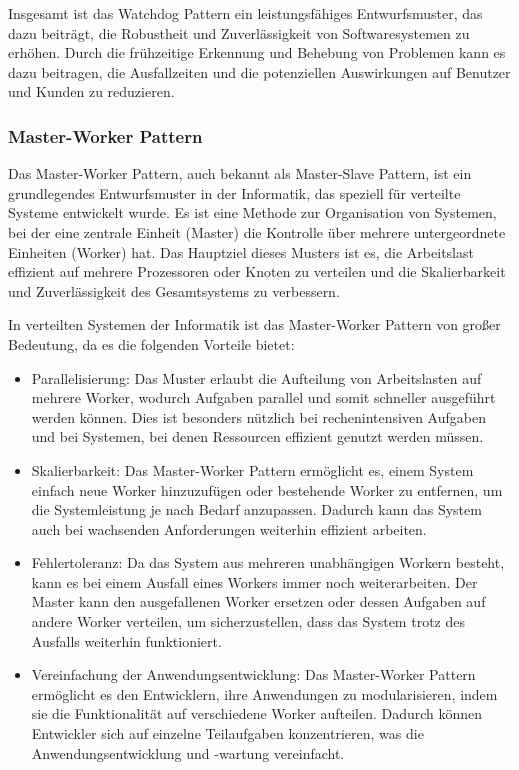 Insgesamt ist das Watchdog Pattern ein leistungsfähiges Entwurfsmuster, das dazu beiträgt, die Robustheit und Zuverlässigkeit von Softwaresystemen zu erhöhen. Durch die frühzeitige Erkennung und Behebung von Problemen kann es dazu beitragen, die Ausfallzeiten und die potenziellen Auswirkungen auf Benutzer und Kunden zu reduzieren.

\subsubsection{Master-Worker Pattern}
Das Master-Worker Pattern, auch bekannt als Master-Slave Pattern, ist ein grundlegendes Entwurfsmuster in der Informatik, das speziell für verteilte Systeme entwickelt wurde. Es ist eine Methode zur Organisation von Systemen, bei der eine zentrale Einheit (Master) die Kontrolle über mehrere untergeordnete Einheiten (Worker) hat. Das Hauptziel dieses Musters ist es, die Arbeitslast effizient auf mehrere Prozessoren oder Knoten zu verteilen und die Skalierbarkeit und Zuverlässigkeit des Gesamtsystems zu verbessern.

In verteilten Systemen der Informatik ist das Master-Worker Pattern von großer Bedeutung, da es die folgenden Vorteile bietet:
\begin{itemize} 
\item Parallelisierung: Das Muster erlaubt die Aufteilung von Arbeitslasten auf mehrere Worker, wodurch Aufgaben parallel und somit schneller ausgeführt werden können. Dies ist besonders nützlich bei rechenintensiven Aufgaben und bei Systemen, bei denen Ressourcen effizient genutzt werden müssen.
\item Skalierbarkeit: Das Master-Worker Pattern ermöglicht es, einem System einfach neue Worker hinzuzufügen oder bestehende Worker zu entfernen, um die Systemleistung je nach Bedarf anzupassen. Dadurch kann das System auch bei wachsenden Anforderungen weiterhin effizient arbeiten.
\item Fehlertoleranz: Da das System aus mehreren unabhängigen Workern besteht, kann es bei einem Ausfall eines Workers immer noch weiterarbeiten. Der Master kann den ausgefallenen Worker ersetzen oder dessen Aufgaben auf andere Worker verteilen, um sicherzustellen, dass das System trotz des Ausfalls weiterhin funktioniert.
\item Vereinfachung der Anwendungsentwicklung: Das Master-Worker Pattern ermöglicht es den Entwicklern, ihre Anwendungen zu modularisieren, indem sie die Funktionalität auf verschiedene Worker aufteilen. Dadurch können Entwickler sich auf einzelne Teilaufgaben konzentrieren, was die Anwendungsentwicklung und -wartung vereinfacht.
\end{itemize}    

